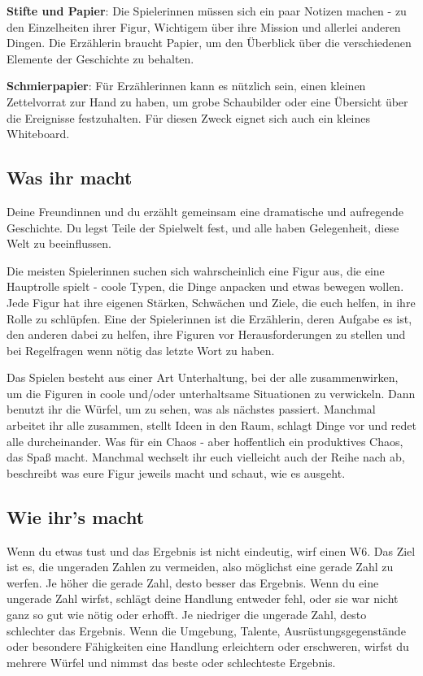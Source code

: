 \documentclass[]{article}
\begin{document}
\textbf{Stifte und Papier}: Die Spielerinnen müssen sich ein paar
Notizen machen - zu den Einzelheiten ihrer Figur, Wichtigem über ihre
Mission und allerlei anderen Dingen. Die Erzählerin braucht Papier, um
den Überblick über die verschiedenen Elemente der Geschichte zu
behalten.

\textbf{Schmierpapier}: Für Erzählerinnen kann es nützlich sein, einen
kleinen Zettelvorrat zur Hand zu haben, um grobe Schaubilder oder eine
Übersicht über die Ereignisse festzuhalten. Für diesen Zweck eignet sich
auch ein kleines Whiteboard.

\subsection{Was ihr macht}\label{was-ihr-macht}

Deine Freundinnen und du erzählt gemeinsam eine dramatische und
aufregende Geschichte. Du legst Teile der Spielwelt fest, und alle haben
Gelegenheit, diese Welt zu beeinflussen.

Die meisten Spielerinnen suchen sich wahrscheinlich eine Figur aus, die
eine Hauptrolle spielt - coole Typen, die Dinge anpacken und etwas
bewegen wollen. Jede Figur hat ihre eigenen Stärken, Schwächen und
Ziele, die euch helfen, in ihre Rolle zu schlüpfen. Eine der
Spielerinnen ist die Erzählerin, deren Aufgabe es ist, den anderen dabei
zu helfen, ihre Figuren vor Herausforderungen zu stellen und bei
Regelfragen wenn nötig das letzte Wort zu haben.

Das Spielen besteht aus einer Art Unterhaltung, bei der alle
zusammenwirken, um die Figuren in coole und/oder unterhaltsame
Situationen zu verwickeln. Dann benutzt ihr die Würfel, um zu sehen, was
als nächstes passiert. Manchmal arbeitet ihr alle zusammen, stellt Ideen
in den Raum, schlagt Dinge vor und redet alle durcheinander. Was für ein
Chaos - aber hoffentlich ein produktives Chaos, das Spaß macht. Manchmal
wechselt ihr euch vielleicht auch der Reihe nach ab, beschreibt was eure
Figur jeweils macht und schaut, wie es ausgeht.

\subsection{Wie ihr's macht}\label{wie-ihrs-macht}

Wenn du etwas tust und das Ergebnis ist nicht eindeutig, wirf einen W6.
Das Ziel ist es, die ungeraden Zahlen zu vermeiden, also möglichst eine
gerade Zahl zu werfen. Je höher die gerade Zahl, desto besser das
Ergebnis. Wenn du eine ungerade Zahl wirfst, schlägt deine Handlung
entweder fehl, oder sie war nicht ganz so gut wie nötig oder erhofft. Je
niedriger die ungerade Zahl, desto schlechter das Ergebnis. Wenn die
Umgebung, Talente, Ausrüstungsgegenstände oder besondere Fähigkeiten
eine Handlung erleichtern oder erschweren, wirfst du mehrere Würfel und
nimmst das beste oder schlechteste Ergebnis.
\end{document}
